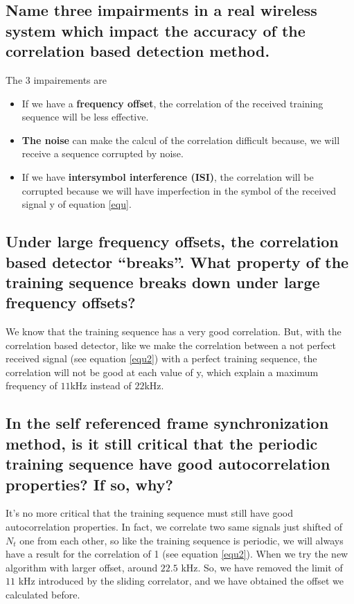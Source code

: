 \documentclass[frenchb, oneside, headings=normal]{scrartcl}
\begin{document}
\subsection{Name three impairments in a real wireless system which impact the accuracy of the correlation based detection method.}

The 3 impairements are 

\begin{itemize}

\item If we have a \textbf{frequency offset}, the correlation of the received training sequence will be less effective.

\item \textbf{The noise} can make the calcul of the correlation difficult because, we will receive a sequence corrupted by noise.

\item If we have \textbf{intersymbol interference (ISI)}, the correlation will be corrupted because we will have imperfection in the symbol of the received signal y of equation \ref{equ}.
\end{itemize}

\subsection{Under large frequency offsets, the correlation based detector “breaks”. What property of the training sequence breaks down under large frequency offsets?}

We know that the training sequence has a very good correlation. But, with the correlation based detector, like we make the correlation between a not perfect received signal (see equation \ref{equ2}) with a perfect training sequence, the correlation will not be good at each value of y, which explain a maximum frequency of $11$\si{\kilo\hertz} instead of $22$\si{\kilo\hertz}.
 
\subsection{In the self referenced frame synchronization method, is it still critical that the periodic training sequence have good autocorrelation properties? If so, why?}

It's no more critical that the training sequence must still have good autocorrelation properties. In fact, we correlate two same signals just shifted of $N_t$ one from each other, so like the training sequence is periodic, we will always have a result for the correlation of 1 (see equation \ref{equ2}). When we try the new algorithm with larger offset, around $22.5$ \si{\kilo\hertz}. So, we have removed the limit of $11$ \si{\kilo\hertz} introduced by the sliding correlator, and we have obtained the offset we calculated before.
\end{document}

